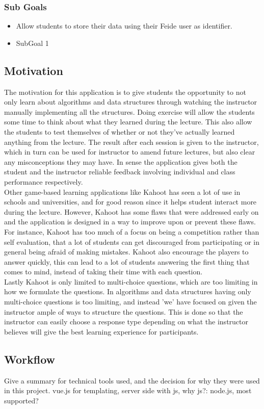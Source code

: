 \subsubsection{Sub Goals}
\begin{itemize}
\item Allow students to store their data using their Feide user as identifier.
\item SubGoal 1 
\end{itemize}

\subsection{Motivation}
The motivation for this application is to give students the opportunity to not only learn about algorithms and data structures through watching the instructor manually implementing all the structures. Doing exercise will allow the students some time to think about what they learned during the lecture. This also allow the students to test themselves of whether or not they've actually learned anything from the lecture. The result after each session is given to the instructor, which in turn can be used for instructor to amend future lectures, but also clear any misconceptions they may have. In sense the application gives both the student and the instructor reliable feedback involving individual and class performance respectively.
\\[11pt]
Other game-based learning applications like Kahoot has seen a lot of use in schools and universities, and for good reason since it helps student interact more during the lecture. However, Kahoot has some flaws that were addressed early on and the application is designed in a way to improve upon or prevent these flaws. For instance, Kahoot has too much of a focus on being a competition rather than self evaluation, that a lot of students can get discouraged from participating or in general being afraid of making mistakes. Kahoot also encourage the players to answer quickly, this can lead to a lot of students answering the first thing that comes to mind, instead of taking their time with each question.
\\[11pt]
Lastly Kahoot is only limited to multi-choice questions, which are too limiting in how we formulate the questions. In algorithms and data structures having only multi-choice questions is too limiting, and instead 'we' have focused on given the instructor ample of ways to structure the questions. This is done so that the instructor can easily choose a response type depending on what the instructor believes will give the best learning experience for participants.

\subsection{Workflow}
Give a summary for technical tools used, and the decision for why they were used in this project. vue.js for templating, server side with js, why js?: node.js, most supported?
